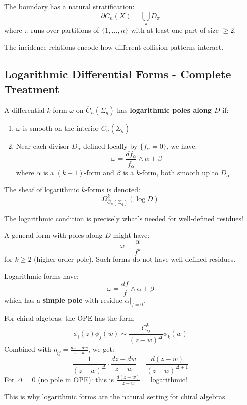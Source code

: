 \begin{theorem}
The boundary has a natural stratification:
$$\partial\overline{C}_n(X) = \bigcup_{\pi} D_\pi$$
where $\pi$ runs over partitions of $\{1, \ldots, n\}$ with at least one part of size $\geq 2$.
\end{theorem}

The incidence relations encode how different collision patterns interact.

\subsection{Logarithmic Differential Forms - Complete Treatment}

\begin{definition}\label{def:log-forms}
A differential $k$-form $\omega$ on $\overline{C}_n(\Sigma_g)$ has \textbf{logarithmic poles along $D$} if:
\begin{enumerate}
\item $\omega$ is smooth on the interior $C_n(\Sigma_g)$
\item Near each divisor $D_\alpha$ defined locally by $\{f_\alpha = 0\}$, we have:
$$\omega = \frac{df_\alpha}{f_\alpha} \wedge \alpha + \beta$$
where $\alpha$ is a $(k-1)$-form and $\beta$ is a $k$-form, both smooth up to $D_\alpha$
\end{enumerate}

The sheaf of logarithmic $k$-forms is denoted:
$$\Omega^k_{\overline{C}_n(\Sigma_g)}(\log D)$$
\end{definition}

\begin{remark}\label{rem:why-log}
The logarithmic condition is precisely what's needed for well-defined residues!

A general form with poles along $D$ might have:
$$\omega = \frac{\alpha}{f^k}$$
for $k \geq 2$ (higher-order pole). Such forms do not have well-defined residues.

Logarithmic forms have:
$$\omega = \frac{df}{f} \wedge \alpha + \beta$$
which has a \textbf{simple pole} with residue $\alpha|_{f=0}$.

For chiral algebras: the OPE has the form
$$\phi_i(z)\phi_j(w) \sim \frac{C_{ij}^k}{(z-w)^\Delta} \phi_k(w)$$
Combined with $\eta_{ij} = \frac{dz-dw}{z-w}$, we get:
$$\frac{1}{(z-w)^\Delta} \cdot \frac{dz-dw}{z-w} = \frac{d(z-w)}{(z-w)^{\Delta+1}}$$
For $\Delta = 0$ (no pole in OPE): this is $\frac{d(z-w)}{z-w}$ = logarithmic!

This is why logarithmic forms are the natural setting for chiral algebras.
\end{remark}

